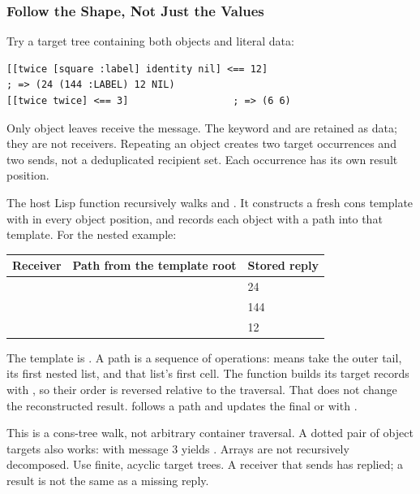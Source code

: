 \subsubsection{Follow the Shape, Not Just the Values}

Try a target tree containing both objects and literal data:

\begin{codeblock}
\begin{lstlisting}
[[twice [square :label] identity nil] <== 12]
; => (24 (144 :LABEL) 12 NIL)
[[twice twice] <== 3]                  ; => (6 6)
\end{lstlisting}
\end{codeblock}

Only object leaves receive the message. The keyword  and
 are retained as data; they are not receivers. Repeating an
object creates two target occurrences and two sends, not a deduplicated
recipient set. Each occurrence has its own result position.

The host Lisp function  recursively walks
 and . It constructs a fresh cons template with
 in every object position, and records each object with a path
into that template. For the nested example:

\begin{longtable}{L{0.21\textwidth}L{0.37\textwidth}L{0.32\textwidth}}
\textbf{Receiver} & \textbf{Path from the template root} & \textbf{Stored reply}\\\hline
{} &  & 24\\
 &  & 144\\
 &  & 12\\
\end{longtable}

The template is . A path is a sequence
of operations:  means take the outer tail, its
first nested list, and that list's first cell. The function builds its
target records with , so their order is reversed relative to
the traversal. That does not change the reconstructed result.
 follows a path and updates the final
 or  with .

This is a cons-tree walk, not arbitrary container traversal. A dotted
pair of object targets also works:  with message
3 yields . Arrays are not recursively decomposed.
Use finite, acyclic target trees. A receiver that sends 
has replied; a  result is not the same as a missing reply.

